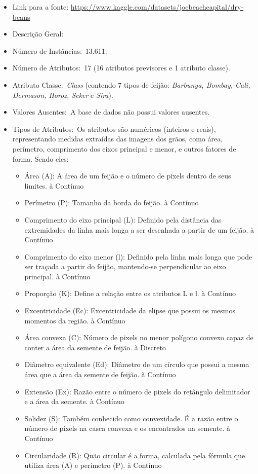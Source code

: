 \documentclass[
  letterpaper,
  DIV=11,
  numbers=noendperiod]{scrartcl}
\begin{document}
\begin{itemize}
\item
  Link para a fonte:
  \url{https://www.kaggle.com/datasets/joebeachcapital/dry-beans}
\item
  Descrição Geral:
\item
  Número de Instâncias:~13.611.
\item
  Número de Atributos:~17 (16 atributos previsores e 1 atributo classe).
\item
  Atributo Classe:~\emph{Class} (contendo 7 tipos de feijão:
  \emph{Barbunya, Bombay, Cali, Dermason, Horoz, Seker} e \emph{Sira}).
\item
  Valores Ausentes:~A base de dados não possui valores ausentes.
\item
  Tipos de Atributos:~Os atributos são numéricos (inteiros e reais),
  representando medidas extraídas das imagens dos grãos, como área,
  perímetro, comprimento dos eixos principal e menor, e outros fatores
  de forma. Sendo eles:

  \begin{itemize}
  \item
    Área (A): A área de um feijão e o número de pixels dentro de seus
    limites. à Contínuo
  \item
    Perímetro (P): Tamanho da borda do feijão. à Contínuo
  \item
    Comprimento do eixo principal (L): Definido pela distância das
    extremidades da linha mais longa a ser desenhada a partir de um
    feijão. à Contínuo
  \item
    Comprimento do eixo menor (l): Definido pela linha mais longa que
    pode ser traçada a partir do feijão, mantendo-se perpendicular ao
    eixo principal. à Contínuo
  \item
    Proporção (K): Define a relação entre os atributos L e l. à Contínuo
  \item
    Excentricidade (Ec): Excentricidade da elipse que possui os mesmos
    momentos da região. à Contínuo
  \item
    Área convexa (C): Número de pixels no menor polígono convexo capaz
    de conter a área da semente de feijão. à Discreto
  \item
    Diâmetro equivalente (Ed): Diâmetro de um círculo que possui a mesma
    área que a área da semente de feijão. à Contínuo
  \item
    Extensão (Ex): Razão entre o número de pixels do retângulo
    delimitador e a área da semente. à Contínuo
  \item
    Solidez (S): Também conhecido como convexidade. É a razão entre o
    número de pixels na casca convexa e os encontrados na semente. à
    Contínuo
  \item
    Circularidade (R): Quão circular é a forma, calculada pela fórmula
    que utiliza área (A) e perímetro (P). à Contínuo


\end{itemize}
\end{itemize}
\end{document}

